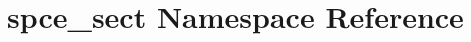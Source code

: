 \hypertarget{namespacespce__sect}{
\section{spce\_\-sect Namespace Reference}
\label{namespacespce__sect}
}
